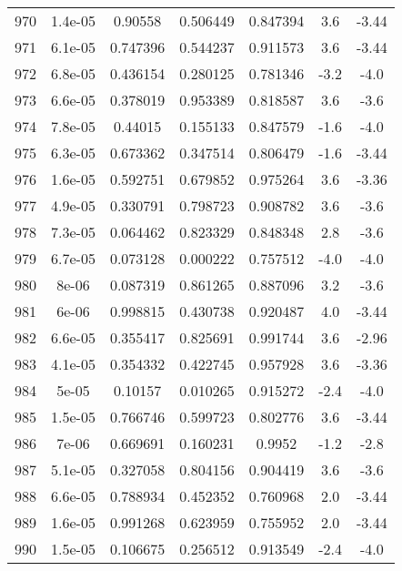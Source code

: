 \begin{table}
\begin{tabular}{c|c|c|c|c|c|c}
970 & 1.4e-05 & 0.90558 & 0.506449 & 0.847394 & 3.6 & -3.44\\
971 & 6.1e-05 & 0.747396 & 0.544237 & 0.911573 & 3.6 & -3.44\\
972 & 6.8e-05 & 0.436154 & 0.280125 & 0.781346 & -3.2 & -4.0\\
973 & 6.6e-05 & 0.378019 & 0.953389 & 0.818587 & 3.6 & -3.6\\
974 & 7.8e-05 & 0.44015 & 0.155133 & 0.847579 & -1.6 & -4.0\\
975 & 6.3e-05 & 0.673362 & 0.347514 & 0.806479 & -1.6 & -3.44\\
976 & 1.6e-05 & 0.592751 & 0.679852 & 0.975264 & 3.6 & -3.36\\
977 & 4.9e-05 & 0.330791 & 0.798723 & 0.908782 & 3.6 & -3.6\\
978 & 7.3e-05 & 0.064462 & 0.823329 & 0.848348 & 2.8 & -3.6\\
979 & 6.7e-05 & 0.073128 & 0.000222 & 0.757512 & -4.0 & -4.0\\
980 & 8e-06 & 0.087319 & 0.861265 & 0.887096 & 3.2 & -3.6\\
981 & 6e-06 & 0.998815 & 0.430738 & 0.920487 & 4.0 & -3.44\\
982 & 6.6e-05 & 0.355417 & 0.825691 & 0.991744 & 3.6 & -2.96\\
983 & 4.1e-05 & 0.354332 & 0.422745 & 0.957928 & 3.6 & -3.36\\
984 & 5e-05 & 0.10157 & 0.010265 & 0.915272 & -2.4 & -4.0\\
985 & 1.5e-05 & 0.766746 & 0.599723 & 0.802776 & 3.6 & -3.44\\
986 & 7e-06 & 0.669691 & 0.160231 & 0.9952 & -1.2 & -2.8\\
987 & 5.1e-05 & 0.327058 & 0.804156 & 0.904419 & 3.6 & -3.6\\
988 & 6.6e-05 & 0.788934 & 0.452352 & 0.760968 & 2.0 & -3.44\\
989 & 1.6e-05 & 0.991268 & 0.623959 & 0.755952 & 2.0 & -3.44\\
990 & 1.5e-05 & 0.106675 & 0.256512 & 0.913549 & -2.4 & -4.0\\
\end{tabular}
\end{table}
\newpage

